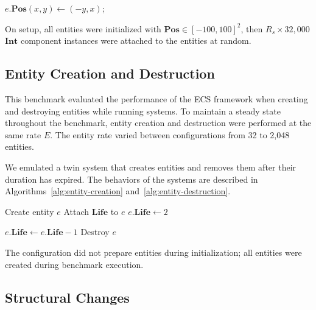 \documentclass[conference]{IEEEtran}
\begin{document}
    \begin{algorithm}[htbp]
    \caption{Sparse Access}
    \label{alg:sparse-access}
    {
        $e.\mathbf{Pos}(x,y) \gets (-y,x)$;
    }
    \end{algorithm}

    On setup, all entities were initialized with $\mathbf{Pos} \in [-100,100]^2$, then
    $R_s \times 32{,}000$ $\mathbf{Int}$ component instances were attached to the entities at random.

    \subsection{Entity Creation and Destruction}
    \label{subsec:entity-creation-and-destruction}

    This benchmark evaluated the performance of the ECS framework when creating and destroying entities while running systems.
    To maintain a steady state throughout the benchmark, entity creation and destruction were performed at the same rate $E$.
    The entity rate varied between configurations from 32 to 2,048 entities.

    We emulated a twin system that creates entities and removes them after their duration has expired.
    The behaviors of the systems are described in Algorithms~\ref{alg:entity-creation} and~\ref{alg:entity-destruction}.

    \begin{algorithm}[h]
        \caption{Entity Creation}
        \label{alg:entity-creation}
        {
            Create entity $e$\;
        Attach $\mathbf{Life}$ to $e$\;
            $e.\mathbf{Life} \gets 2$\;
        }
    \end{algorithm}

    \begin{algorithm}[h]
        \caption{Entity Destruction}
        \label{alg:entity-destruction}
        {
            $e.\mathbf{Life} \gets e.\mathbf{Life} - 1$\;
        {
            Destroy $e$
        }
        }
    \end{algorithm}

    The configuration did not prepare entities during initialization; all entities were created during benchmark execution.

    \subsection{Structural Changes}
    \label{subsec:structural-changes}
\end{document}
